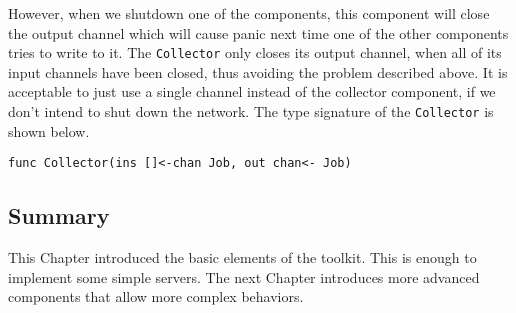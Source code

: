 However, when we shutdown
one of the components, this component will close the output channel
which will cause panic next time one of the other components tries to write
to it. The \texttt{Collector} only closes its output channel, when
all of its input channels have been closed, thus avoiding the problem 
described above. It is acceptable to just use a single channel instead of
the collector component, if we don't intend to shut down the network.
The type signature of the \texttt{Collector} is shown below.
\begin{lstlisting}
func Collector(ins []<-chan Job, out chan<- Job)
\end{lstlisting}


\subsection{Summary}
This Chapter introduced the basic elements of the toolkit. This 
is enough to implement some simple servers. The next Chapter introduces
more advanced components that allow more complex behaviors.

